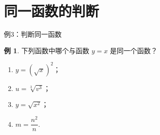 \documentclass[aspectratio=169,13pt,t] {beamer}
\theoremstyle{definition}
\newtheorem{exam}{例}
\begin{document}
\section{同一函数的判断}

%

\begin{frame}{例3：判断同一函数}
	\begin{exam}
	下列函数中哪个与函数 \(y = x\) 是同一个函数？
	\begin{enumerate}[(1)]
		\item \(y = (\sqrt{x})^2\)；
		\item \(u = \sqrt[3]{v^3}\)；
		\item \(y = \sqrt{x^2}\)；
		\item \(m = \dfrac{n^2}{n}\).
	\end{enumerate}
	\end{exam}
\end{frame}
\end{document}
